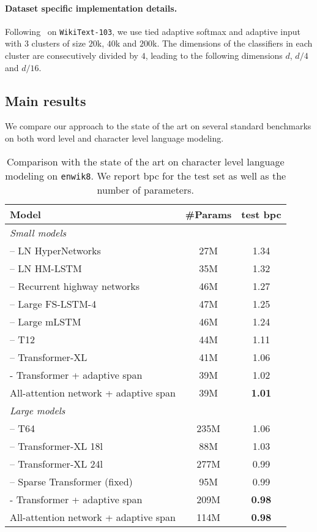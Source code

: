 \documentclass{article}
\begin{document}
\paragraph{Dataset specific implementation details.}
Following~\citet{baevski2018adaptive} on \texttt{WikiText-103}, we use tied adaptive softmax and adaptive input with $3$ clusters of size $20$k, $40$k and $200$k.
The dimensions of the classifiers in each cluster are consecutively divided by $4$, leading to the following dimensions $d$, $d/4$ and $d/16$.

\subsection{Main results}

We compare our approach to the state of the art on several standard benchmarks on both word level and character level language modeling.

\begin{table}[t]
\centering
\caption{
  Comparison with the state of the art on character level language modeling on \texttt{enwik8}.
  We report bpc for the test set as well as the number of parameters.
}
\label{tab:enwik8}
\begin{tabular}{lcc}
  \toprule
  Model & \#Params  & test bpc \\
  \midrule
  \multicolumn{3}{l}{\emph{Small models}}\\
  \citet{ha2016hypernetworks} – LN HyperNetworks & 27M  & 1.34\\
  \citet{chung2016hierarchical} – LN HM-LSTM & 35M   & 1.32\\
  \citet{zilly2017recurrent} – Recurrent highway networks & 46M  & 1.27\\
  \citet{mujika2017fast} – Large FS-LSTM-4 & 47M  &1.25\\
  \citet{krause2016multiplicative} – Large mLSTM & 46M  &1.24\\
  \citet{al2018character} – T12  & 44M &  1.11 \\
  \citet{dai2019transformer} – Transformer-XL  & 41M & 1.06 \\
  \citet{sukhbaatar2019adaptive} - Transformer + adaptive span  & 39M & 1.02 \\
  All-attention network + adaptive span & 39M & \bf 1.01 \\
  \midrule
  \multicolumn{3}{l}{\emph{Large models}}\\
  \citet{al2018character} – T64 & 235M & 1.06 \\
  \citet{dai2019transformer} – Transformer-XL 18l  & 88M & 1.03 \\
  \citet{dai2019transformer} – Transformer-XL 24l & 277M & 0.99 \\
  \citet{child2019generating} – Sparse Transformer (fixed) & 95M & 0.99 \\
  \citet{sukhbaatar2019adaptive} - Transformer + adaptive span  &  209M &  \bf 0.98 \\
  All-attention network + adaptive span & 114M & \bf 0.98 \\
  \bottomrule
\end{tabular}
\end{table}
\end{document}
